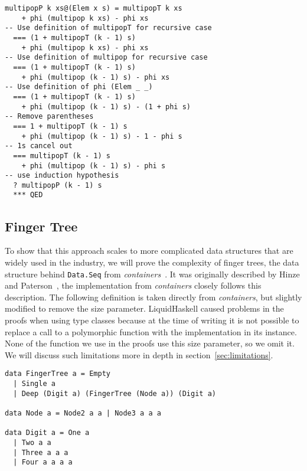 \documentclass[sigplan,screen,review,anonymous]{acmart}
\begin{document}
\begin{lstlisting}
multipopP k xs@(Elem x s) = multipopT k xs
    + phi (multipop k xs) - phi xs
-- Use definition of multipopT for recursive case
  === (1 + multipopT (k - 1) s)
    + phi (multipop k xs) - phi xs
-- Use definition of multipop for recursive case
  === (1 + multipopT (k - 1) s)
    + phi (multipop (k - 1) s) - phi xs
-- Use definition of phi (Elem _ _)
  === (1 + multipopT (k - 1) s)
    + phi (multipop (k - 1) s) - (1 + phi s)
-- Remove parentheses
  === 1 + multipopT (k - 1) s
    + phi (multipop (k - 1) s) - 1 - phi s
-- 1s cancel out
  === multipopT (k - 1) s
    + phi (multipop (k - 1) s) - phi s
-- use induction hypothesis
  ? multipopP (k - 1) s
  *** QED
\end{lstlisting}

\subsection{Finger Tree}\label{sec:fingertree}

To show that this approach scales to more complicated data structures that are widely used in the industry, we will prove the complexity of finger trees, the data structure behind \texttt{Data.Seq} from \textit{containers}~\cite{containers}. It was originally described by Hinze and Paterson~\cite{fingertrees}, the implementation from \textit{containers} closely follows this description. The following definition is taken directly from \textit{containers}, but slightly modified to remove the size parameter. LiquidHaskell caused problems in the proofs when using type classes because at the time of writing it is not possible to replace a call to a polymorphic function with the implementation in its instance. None of the function we use in the proofs use this size parameter, so we omit it. We will discuss such limitations more in depth in section~\ref{sec:limitations}.

\begin{lstlisting}
data FingerTree a = Empty
  | Single a
  | Deep (Digit a) (FingerTree (Node a)) (Digit a)

data Node a = Node2 a a | Node3 a a a

data Digit a = One a
  | Two a a
  | Three a a a
  | Four a a a a
\end{lstlisting}
\end{document}
